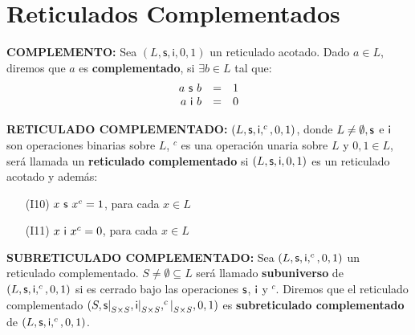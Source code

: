 \section{Reticulados Complementados}

  \PN \textbf{COMPLEMENTO:} Sea $(L,\mathsf{s},\mathsf{i},0,1)$ un reticulado acotado. Dado $a \in L$, diremos que
  $a$ es \textbf{complementado}, si $\exists b \in L$ tal que:
  \[
    \begin{array}{rcl}
      a \ \mathsf{s} \ b &=& 1 \\
      a \ \mathsf{i} \ b &=& 0
    \end{array}
  \]

  \PN \textbf{RETICULADO COMPLEMENTADO:} $(L, \mathsf{s}, \mathsf{i}, ^{c}, 0, 1)$, donde $L \neq \emptyset, \mathsf{s}$ e $\mathsf{i}$ son
  operaciones binarias sobre $L$, $^{c}$ es una operación unaria sobre $L$ y $0, 1 \in L$, será llamada un
  \textbf{reticulado complementado} si $(L, \mathsf{s}, \mathsf{i}, 0, 1)$ es un reticulado acotado y además:
  \begin{enumerate}
    \item[(I10)] $x \ \mathsf{s} \ x^{c} = 1$, para cada $x \in L$
    \item[(I11)] $x \ \mathsf{i} \ x^{c} = 0$, para cada $x \in L$
  \end{enumerate}

  \vspace{3mm}
  \PN \textbf{SUBRETICULADO COMPLEMENTADO:} Sea $(L, \mathsf{s}, \mathsf{i}, ^{c}, 0, 1)$ un reticulado complementado. $S \neq
  \emptyset \subseteq L$ será llamado \textbf{subuniverso} de $(L, \mathsf{s}, \mathsf{i}, ^{c}, 0, 1)$ si es cerrado bajo las
  operaciones $\mathsf{s}$, $\mathsf{i}$ y $^{c}$. Diremos que el reticulado complementado $(S, \mathsf{s}\mathrm{\mid}_{S \times S},
  \mathsf{i}\mathrm{\mid}_{S \times S}, ^{c}\mathrm{\mid}_{S \times S}, 0, 1)$ es \textbf{subreticulado complementado} de $(L,
  \mathsf{s}, \mathsf{i}, ^{c}, 0, 1)$.

